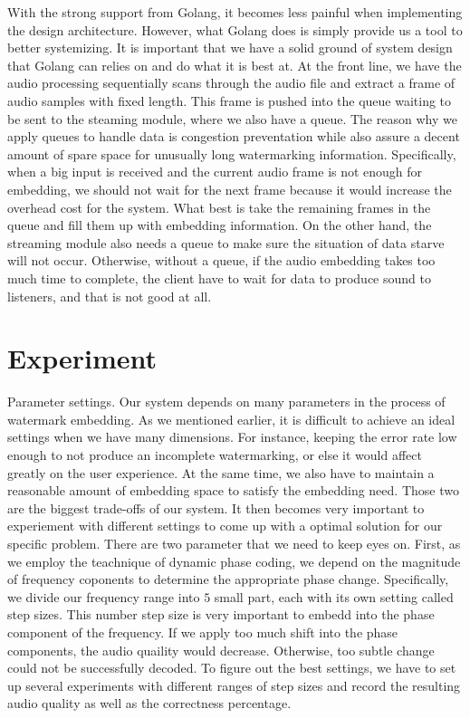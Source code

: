 \documentclass[conference]{IEEEtran}
\begin{document}
With the strong support from Golang, it becomes less painful when implementing the design architecture. However, what Golang does is simply provide us a tool to better systemizing. It is important that we have a solid ground of system design that Golang can relies on and do what it is best at. At the front line, we have the audio processing sequentially scans through the audio file and extract a frame of audio samples with fixed length. This frame is pushed into the queue waiting to be sent to the steaming module, where we also have a queue. The reason why we apply queues to handle data is congestion preventation while also assure a decent amount of spare space for unusually long watermarking information. Specifically, when a big input is received and the current audio frame is not enough for embedding, we should not wait for the next frame because it would increase the overhead cost for the system. What best is take the remaining frames in the queue and fill them up with embedding information. On the other hand, the streaming module also needs a queue to make sure the situation of data starve will not occur. Otherwise, without a queue, if the audio embedding takes too much time to complete, the client have to wait for data to produce sound to listeners, and that is not good at all. 

\section{Experiment}
 
Parameter settings. Our system depends on many parameters in the process of watermark embedding. As we mentioned earlier, it is difficult to achieve an ideal settings when we have many dimensions. For instance, keeping the error rate low enough to not produce an incomplete watermarking, or else it would affect greatly on the user experience. At the same time, we also have to maintain a reasonable amount of embedding space to satisfy the embedding need. Those two are the biggest trade-offs of our system. It then becomes very important to experiement with different settings to come up with a optimal solution for our specific problem. There are two parameter that we need to keep eyes on. First, as we employ the teachnique of dynamic phase coding, we depend on the magnitude of frequency coponents to determine the appropriate phase change. Specifically, we divide our frequency range into \(5\) small part, each with its own setting called step sizes. This number step size is very important to embedd into the phase component of the frequency. If we apply too much shift into the phase components, the audio quaility would decrease. Otherwise, too subtle change could not be successfully decoded. To figure out the best settings, we have to set up several experiments with different ranges of step sizes and record the resulting audio quality as well as the correctness percentage.
\end{document}
